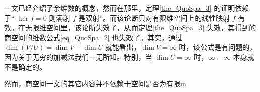 

一文已经介绍了余维数的概念，然而在那里，定理\autoref{the_QuoSpa_3} 的证明依赖于“ $\ker f=0$ 则满射 $f$ 是双射”。而该论断只对有限维空间上的线性映射 $f$ 有效。在无限维空间里，该论断失效了，从而定理\autoref{the_QuoSpa_3} 失效，其得到的商空间的维数公式\autoref{eq_QuoSpa_2} 也失效了。其实，通过 $\dim(V/U) = \dim V - \dim U$ 就能看出，$\dim V=\infty$ 时，该公式是有问题的，因为关于无穷的加减法我们一无所知。特别，当 $\dim U=\infty$ 时，$\infty-\infty$ 本身就不是确定的。

然而，商空间一文的其它内容并不依赖于空间是否为有限m 


